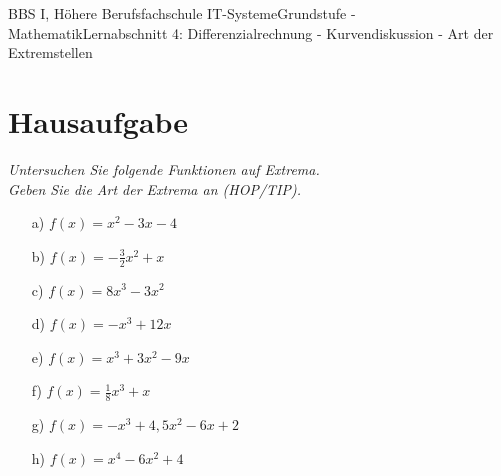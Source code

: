 \documentclass[oneside,openany,headings=optiontotoc,11pt,numbers=noenddot]{scrreprt}
\begin{document}
		\begin{worksheet}{BBS I, Höhere Berufsfachschule IT-Systeme}{Grundstufe - Mathematik}{Lernabschnitt 4: Differenzialrechnung - Kurvendiskussion - Art der Extremstellen}
			\noindent
			\section*{Hausaufgabe}
			\textit{Untersuchen Sie folgende Funktionen auf Extrema.\\
			Geben Sie die Art der Extrema an (HOP/TIP).}
			\renewcommand{\arraystretch}{1.5}
			\begin{itemize}
				\item[a)] \(f(x) = x^2 - 3x -4\)
				\item[b)] \(f(x) = -\frac{3}{2}x^2+x\)
				\item[c)] \(f(x) = 8x^3 - 3x^2\)
				\item[d)] \(f(x) = -x^3 +12x\)
				\item[e)] \(f(x) = x^3 + 3x^2 - 9x\)
				\item[f)] \(f(x) = \frac{1}{8}x^3 + x\)
				\item[g)] \(f(x) = -x^3 + 4,5x^2 -6x + 2\)
				\item[h)] \(f(x) = x^4 - 6x^2 + 4\)
			\end{itemize}
		\end{worksheet}
\end{document}
